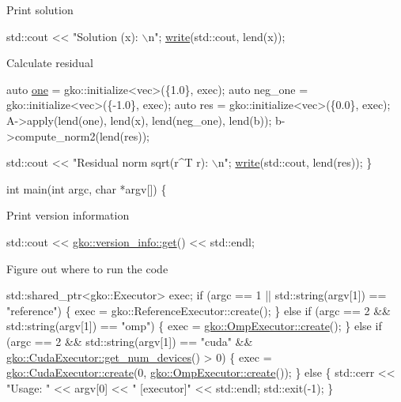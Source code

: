 Print solution


\begin{DoxyCode}
std::cout << \textcolor{stringliteral}{"Solution (x): \(\backslash\)n"};
\hyperlink{namespacegko_a859dc47a462721d83728d91ab7fa2148}{write}(std::cout, lend(x));
\end{DoxyCode}


Calculate residual


\begin{DoxyCode}
    \textcolor{keyword}{auto} \hyperlink{namespacegko_a0059e27f8f4bc348ff65c1e60caf47c8}{one} = gko::initialize<vec>(\{1.0\}, exec);
    \textcolor{keyword}{auto} neg\_one = gko::initialize<vec>(\{-1.0\}, exec);
    \textcolor{keyword}{auto} res = gko::initialize<vec>(\{0.0\}, exec);
    A->apply(lend(one), lend(x), lend(neg\_one), lend(b));
    b->compute\_norm2(lend(res));

    std::cout << \textcolor{stringliteral}{"Residual norm sqrt(r^T r): \(\backslash\)n"};
    \hyperlink{namespacegko_a859dc47a462721d83728d91ab7fa2148}{write}(std::cout, lend(res));
\}


\textcolor{keywordtype}{int} main(\textcolor{keywordtype}{int} argc, \textcolor{keywordtype}{char} *argv[])
\{
\end{DoxyCode}


Print version information


\begin{DoxyCode}
std::cout << \hyperlink{classgko_1_1version__info_a6daeb8a087cfb57fa055526fc133d8eb}{gko::version\_info::get}() << std::endl;
\end{DoxyCode}


Figure out where to run the code


\begin{DoxyCode}
std::shared\_ptr<gko::Executor> exec;
\textcolor{keywordflow}{if} (argc == 1 || std::string(argv[1]) == \textcolor{stringliteral}{"reference"}) \{
    exec = gko::ReferenceExecutor::create();
\} \textcolor{keywordflow}{else} \textcolor{keywordflow}{if} (argc == 2 && std::string(argv[1]) == \textcolor{stringliteral}{"omp"}) \{
    exec = \hyperlink{classgko_1_1OmpExecutor_a33ca05fdd0fc928ee262fc9425304874}{gko::OmpExecutor::create}();
\} \textcolor{keywordflow}{else} \textcolor{keywordflow}{if} (argc == 2 && std::string(argv[1]) == \textcolor{stringliteral}{"cuda"} &&
           \hyperlink{classgko_1_1CudaExecutor_aef0258494d14de0e56149b920c5173e5}{gko::CudaExecutor::get\_num\_devices}() > 0) \{
    exec = \hyperlink{classgko_1_1CudaExecutor_a2718a92034350650ef406ffdb60db090}{gko::CudaExecutor::create}(0, 
      \hyperlink{classgko_1_1OmpExecutor_a33ca05fdd0fc928ee262fc9425304874}{gko::OmpExecutor::create}());
\} \textcolor{keywordflow}{else} \{
    std::cerr << \textcolor{stringliteral}{"Usage: "} << argv[0] << \textcolor{stringliteral}{" [executor]"} << std::endl;
    std::exit(-1);
\}
\end{DoxyCode}


